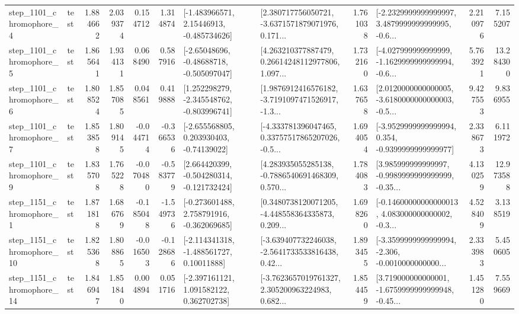 \begin{tabular}{llrrrrllrlrr}
  step\_1101\_chromophore\_4 &      test &      1.884662 &    2.039374 &      0.154712 &  1.314874 &    [-1.483966571, 2.15446913, -0.485734626] &  [2.380717756050721, -3.6371571879071976, 0.171... &       1.761038 &  [-2.2329999999999997, 3.4879999999999995, -0.6... &            2.210976 &          7.155207 \\
  step\_1101\_chromophore\_5 &      test &      1.865641 &    1.934131 &      0.068490 &  0.587916 &    [-2.65048696, -0.48688718, -0.505097047] &  [4.263210377887479, 0.26614248112977806, 1.097... &       1.732160 &  [-4.027999999999999, -1.1629999999999994, -0.6... &            5.763921 &         13.284300 \\
  step\_1101\_chromophore\_6 &      test &      1.808524 &    1.857085 &      0.048561 &  0.419888 &   [1.252298279, -2.345548762, -0.803996741] &  [1.9876912416576182, -3.7191097471526917, -1.3... &       1.637658 &  [2.0120000000000005, -3.6180000000000003, -0.5... &            9.427553 &          9.836955 \\
  step\_1101\_chromophore\_7 &      test &      1.853858 &    1.809145 &     -0.044714 & -0.366536 &    [-2.655568805, 0.203930403, -0.74139022] &  [-4.333781396047465, 0.33757517865207026, -0.5... &       1.694054 &  [-3.9529999999999994, 0.354, -0.9399999999999977] &            2.338673 &          6.111972 \\
  step\_1101\_chromophore\_9 &      test &      1.835708 &    1.765228 &     -0.070480 & -0.583779 &   [2.664420399, -0.504280314, -0.121732424] &  [4.283935055285138, -0.7886540691468309, 0.570... &       1.784083 &  [3.985999999999997, -0.9989999999999999, -0.35... &            4.130259 &         12.973588 \\
  step\_1151\_chromophore\_1 &      test &      1.871818 &    1.686769 &     -0.185048 & -1.549736 &   [-0.273601488, 2.758791916, -0.362069685] &  [0.3480738120071205, -4.448558364335873, 0.209... &       1.698260 &  [-0.14600000000000013, 4.083000000000002, -0.3... &            4.528409 &          3.138519 \\
 step\_1151\_chromophore\_10 &      test &      1.825368 &    1.808865 &     -0.016503 & -0.128686 &    [-2.114341318, -1.488561727, 0.10011888] &  [-3.639407732246038, -2.5641733533816438, 0.42... &       1.893455 &  [-3.3599999999999994, -2.306, -0.0010000000000... &            2.333983 &          5.450605 \\
 step\_1151\_chromophore\_14 &      test &      1.846947 &    1.851840 &      0.004894 &  0.051716 &    [-2.397161121, 1.091582122, 0.362702738] &  [-3.7623657019761327, 2.305200963224983, 0.682... &       1.854459 &  [3.719000000000001, -1.6759999999999948, -0.45... &            1.451280 &          7.559669 \\

\end{tabular}
